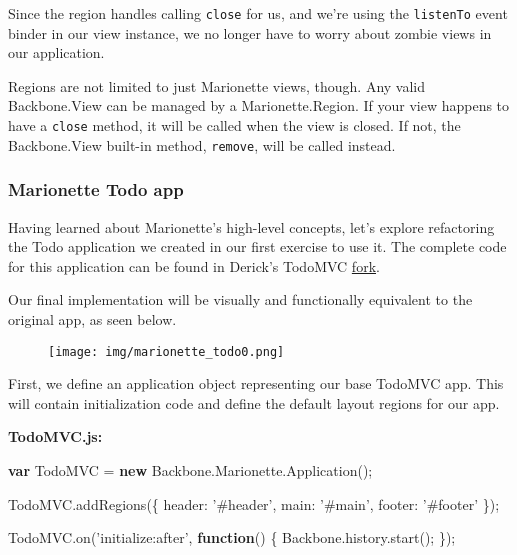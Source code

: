 \documentclass[9pt]{book}
\newenvironment{Shaded}{}{}
\newcommand{\KeywordTok}[1]{\textcolor[rgb]{0.00,0.44,0.13}{\textbf{{#1}}}}
\newcommand{\DataTypeTok}[1]{\textcolor[rgb]{0.56,0.13,0.00}{{#1}}}
\newcommand{\StringTok}[1]{\textcolor[rgb]{0.25,0.44,0.63}{{#1}}}
\newcommand{\OtherTok}[1]{\textcolor[rgb]{0.00,0.44,0.13}{{#1}}}
\newcommand{\FunctionTok}[1]{\textcolor[rgb]{0.02,0.16,0.49}{{#1}}}
\newcommand{\NormalTok}[1]{{#1}}
\begin{document}
Since the region handles calling \texttt{close} for us, and we're using
the \texttt{listenTo} event binder in our view instance, we no longer
have to worry about zombie views in our application.

Regions are not limited to just Marionette views, though. Any valid
Backbone.View can be managed by a Marionette.Region. If your view
happens to have a \texttt{close} method, it will be called when the view
is closed. If not, the Backbone.View built-in method, \texttt{remove},
will be called instead.

\subsubsection{Marionette Todo app}\label{marionette-todo-app}

Having learned about Marionette's high-level concepts, let's explore
refactoring the Todo application we created in our first exercise to use
it. The complete code for this application can be found in Derick's
TodoMVC
\href{https://github.com/derickbailey/todomvc/tree/marionette/labs/architecture-examples/backbone_marionette/js}{fork}.

Our final implementation will be visually and functionally equivalent to
the original app, as seen below.

\begin{figure}[htbp]
\centering
\texttt{[image: img/marionette\_todo0.png]}
\end{figure}

First, we define an application object representing our base TodoMVC
app. This will contain initialization code and define the default layout
regions for our app.

\textbf{TodoMVC.js:}

\begin{Shaded}
\begin{Highlighting}[]
\KeywordTok{var} \NormalTok{TodoMVC = }\KeywordTok{new} \OtherTok{Backbone}\NormalTok{.}\OtherTok{Marionette}\NormalTok{.}\FunctionTok{Application}\NormalTok{();}

\OtherTok{TodoMVC}\NormalTok{.}\FunctionTok{addRegions}\NormalTok{(\{}
  \DataTypeTok{header}\NormalTok{: }\StringTok{'#header'}\NormalTok{,}
  \DataTypeTok{main}\NormalTok{: }\StringTok{'#main'}\NormalTok{,}
  \DataTypeTok{footer}\NormalTok{: }\StringTok{'#footer'}
\NormalTok{\});}

\OtherTok{TodoMVC}\NormalTok{.}\FunctionTok{on}\NormalTok{(}\StringTok{'initialize:after'}\NormalTok{, }\KeywordTok{function}\NormalTok{() \{}
  \OtherTok{Backbone}\NormalTok{.}\OtherTok{history}\NormalTok{.}\FunctionTok{start}\NormalTok{();}
\NormalTok{\});}
\end{Highlighting}
\end{Shaded}
\end{document}
